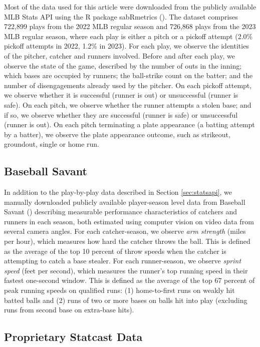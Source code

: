 \documentclass{article}
\begin{document}
      Most of the data used for this article were downloaded from the publicly available MLB Stats API using the R package sabRmetrics (\cite{powers_sabrmetrics_2024}). The dataset comprises 722,899 plays from the 2022 MLB regular season and 726,868 plays from the 2023 MLB regular season, where each play is either a pitch or a pickoff attempt (2.0\% pickoff attempts in 2022, 1.2\% in 2023). For each play, we observe the identities of the pitcher, catcher and runners involved. Before and after each play, we observe the state of the game, described by the number of outs in the inning; which bases are occupied by runners; the ball-strike count on the batter; and the number of disengagements already used by the pitcher. On each pickoff attempt, we observe whether it is successful (runner is out) or unsuccessful (runner is safe). On each pitch, we observe whether the runner attempts a stolen base; and if so, we observe whether they are successful (runner is safe) or unsuccessful (runner is out). On each pitch terminating a plate appearance (a batting attempt by a batter), we observe the plate appearance outcome, such as strikeout, groundout, single or home run.

    \subsection{Baseball Savant}
    \label{sec:baseballsavant}

      In addition to the play-by-play data described in Section \ref{sec:statsapi}, we manually downloaded publicly available player-season level data from Baseball Savant (\cite{mlb_advanced_media_notitle_2024}) describing measurable performance characteristics of catchers and runners in each season, both estimated using computer vision on video data from several camera angles. For each catcher-season, we observe {\it arm strength} (miles per hour), which measures how hard the catcher throws the ball. This is defined as the average of the top 10 percent of throw speeds when the catcher is attempting to catch a base stealer. For each runner-season, we observe {\it sprint speed} (feet per second), which measures the runner's top running speed in their fastest one-second window. This is defined as the average of the top 67 percent of peak running speeds on qualified runs: (1) home-to-first runs on weakly hit batted balls and (2) runs of two or more bases on balls hit into play (excluding runs from second base on extra-base hits).

    \subsection{Proprietary Statcast Data}
\end{document}
